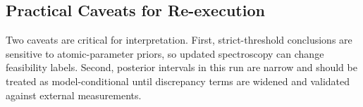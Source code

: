 \documentclass{article} %
\begin{document}
\subsection{Practical Caveats for Re-execution}
Two caveats are critical for interpretation. First, strict-threshold conclusions are sensitive to atomic-parameter priors, so updated spectroscopy can change feasibility labels. Second, posterior intervals in this run are narrow and should be treated as model-conditional until discrepancy terms are widened and validated against external measurements.
\end{document}
